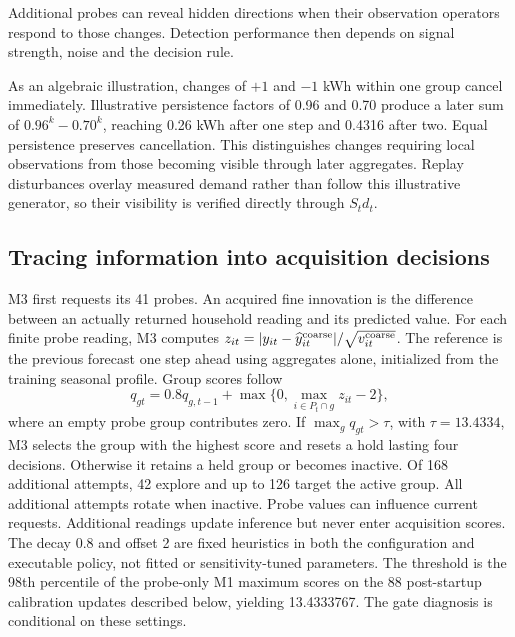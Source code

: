 \documentclass[conference]{IEEEtran}
\begin{document}
Additional probes can reveal hidden directions when their observation operators respond to those changes. Detection performance then depends on signal strength, noise and the decision rule.

As an algebraic illustration, changes of $+1$ and $-1$ kWh within one group cancel immediately. Illustrative persistence factors of 0.96 and 0.70 produce a later sum of $0.96^k-0.70^k$, reaching 0.26 kWh after one step and 0.4316 after two. Equal persistence preserves cancellation. This distinguishes changes requiring local observations from those becoming visible through later aggregates. Replay disturbances overlay measured demand rather than follow this illustrative generator, so their visibility is verified directly through $S_t d_t$.







\subsection{Tracing information into acquisition decisions}
M3 first requests its 41 probes. An acquired fine innovation is the difference between an actually returned household reading and its predicted value. For each finite probe reading, M3 computes $z_{it}=|y_{it}-\widehat y^{\rm coarse}_{it}|/\sqrt{v^{\rm coarse}_{it}}$. The reference is the previous forecast one step ahead using aggregates alone, initialized from the training seasonal profile. Group scores follow
\begin{equation}
q_{gt}=0.8q_{g,t-1}+\max\{0,\max_{i\in P_t\cap g}z_{it}-2\},\label{eq:score}
\end{equation}
where an empty probe group contributes zero. If $\max_gq_{gt}>\tau$, with $\tau=13.4334$, M3 selects the group with the highest score and resets a hold lasting four decisions. Otherwise it retains a held group or becomes inactive. Of 168 additional attempts, 42 explore and up to 126 target the active group. All additional attempts rotate when inactive. Probe values can influence current requests. Additional readings update inference but never enter acquisition scores. The decay 0.8 and offset 2 are fixed heuristics in both the configuration and executable policy, not fitted or sensitivity-tuned parameters. The threshold is the 98th percentile of the probe-only M1 maximum scores on the 88 post-startup calibration updates described below, yielding 13.4333767. The gate diagnosis is conditional on these settings.
\end{document}
